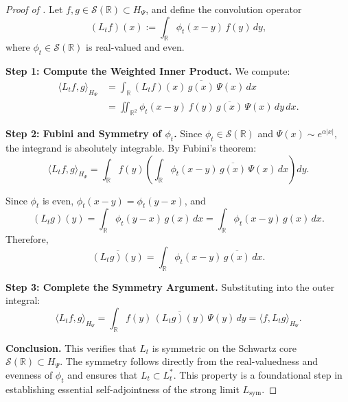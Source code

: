 \begin{proof}[Proof of ]
Let \( f, g \in \mathcal{S}(\mathbb{R}) \subset H_\Psi \), and define the convolution operator
\[
(L_t f)(x) := \int_{\mathbb{R}} \phi_t(x - y)\, f(y)\, dy,
\]
where \( \phi_t \in \mathcal{S}(\mathbb{R}) \) is real-valued and even.

\medskip
\noindent\textbf{Step 1: Compute the Weighted Inner Product.}
We compute:
\[
\begin{aligned}
\langle L_t f, g \rangle_{H_\Psi}
&= \int_{\mathbb{R}} (L_t f)(x)\, \overline{g(x)}\, \Psi(x)\, dx \\
&= \iint_{\mathbb{R}^2} \phi_t(x - y)\, f(y)\, \overline{g(x)}\, \Psi(x)\, dy\, dx.
\end{aligned}
\]

\medskip
\noindent\textbf{Step 2: Fubini and Symmetry of \( \phi_t \).}
Since \( \phi_t \in \mathcal{S}(\mathbb{R}) \) and \( \Psi(x) \sim e^{\alpha |x|} \), the integrand is absolutely integrable. By Fubini’s theorem:
\[
\langle L_t f, g \rangle_{H_\Psi}
= \int_{\mathbb{R}} f(y) \left( \int_{\mathbb{R}} \phi_t(x - y)\, \overline{g(x)}\, \Psi(x)\, dx \right) dy.
\]

Since \( \phi_t \) is even, \( \phi_t(x - y) = \phi_t(y - x) \), and
\[
(L_t g)(y) = \int_{\mathbb{R}} \phi_t(y - x)\, g(x)\, dx = \int_{\mathbb{R}} \phi_t(x - y)\, g(x)\, dx.
\]
Therefore,
\[
\overline{(L_t g)(y)} = \int_{\mathbb{R}} \phi_t(x - y)\, \overline{g(x)}\, dx.
\]

\medskip
\noindent\textbf{Step 3: Complete the Symmetry Argument.}
Substituting into the outer integral:
\[
\langle L_t f, g \rangle_{H_\Psi}
= \int_{\mathbb{R}} f(y)\, \overline{(L_t g)(y)}\, \Psi(y)\, dy = \langle f, L_t g \rangle_{H_\Psi}.
\]

\medskip
\noindent\textbf{Conclusion.}
This verifies that \( L_t \) is symmetric on the Schwartz core \( \mathcal{S}(\mathbb{R}) \subset H_\Psi \). The symmetry follows directly from the real-valuedness and evenness of \( \phi_t \) and ensures that \( L_t \subset L_t^* \). This property is a foundational step in establishing essential self-adjointness of the strong limit \( L_{\mathrm{sym}} \).
\end{proof}
